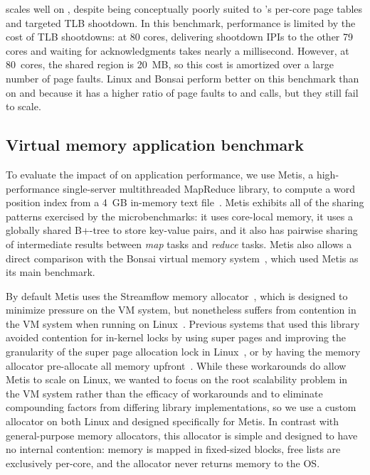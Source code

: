  scales well on \sys, despite being conceptually poorly
suited to \sys's per-core page tables and targeted TLB shootdown.  In
this benchmark, \sys performance is limited by the cost of TLB
shootdowns: at 80 cores, delivering shootdown IPIs to the other 79
cores and waiting for acknowledgments takes nearly a millisecond.
However, at 80~cores, the shared region is 20~MB, so this cost is
amortized over a large number of page faults.
%
Linux and Bonsai perform better on this benchmark than on  and
 because it has a higher ratio of page faults to 
and  calls, but they still fail to scale.


\subsection{Virtual memory application benchmark}

To evaluate the impact of \vm on application performance, we use
Metis, a high-performance single-server multithreaded MapReduce
library, to compute a word position index from a 4~GB in-memory text
file~\cite{dean:mapreduce,metis:tr}.
%
Metis exhibits all of the sharing patterns exercised by the
microbenchmarks: it uses core-local memory, it uses a globally shared
B+-tree to store key-value pairs, and it also has pairwise sharing of
intermediate results between \emph{map} tasks and \emph{reduce} tasks.
%
Metis also allows a direct comparison with the Bonsai virtual memory
system~\cite{clements:bonsai}, which used Metis as its main benchmark.

By default Metis uses the Streamflow memory
allocator~\cite{schneider:streamflow}, which is designed to minimize
pressure on the VM system, but nonetheless suffers from contention in
the VM system when running on Linux~\cite{clements:bonsai}.  Previous
systems that used this library avoided contention for in-kernel locks
by using super pages and improving the granularity of the super page
allocation lock in Linux~\cite{boyd-wickizer:scaling}, or by having
the memory allocator pre-allocate all memory upfront~\cite{metis:tr}.
While these workarounds do allow Metis to scale on Linux, we wanted to
focus on the root scalability problem in the VM system rather than the
efficacy of workarounds and to eliminate compounding factors from
differing library implementations, so we use a custom allocator on
both Linux and \sys designed specifically for Metis.  In contrast with
general-purpose memory allocators, this allocator is simple and
designed to have no internal contention: memory is mapped in
fixed-sized blocks, free lists are exclusively per-core, and the
allocator never returns memory to the OS.

